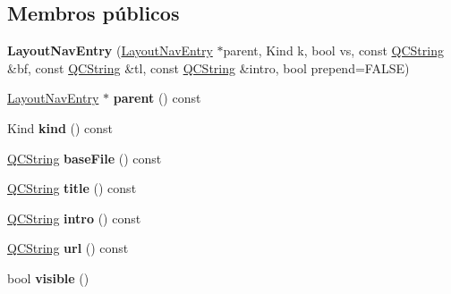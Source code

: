 \subsection*{Membros públicos}
\begin{DoxyCompactItemize}
\item 
\hypertarget{struct_layout_nav_entry_aaf8e4783172c8bc1810d4f166aca1ed6}{{\bfseries Layout\-Nav\-Entry} (\hyperlink{struct_layout_nav_entry}{Layout\-Nav\-Entry} $\ast$parent, Kind k, bool vs, const \hyperlink{class_q_c_string}{Q\-C\-String} \&bf, const \hyperlink{class_q_c_string}{Q\-C\-String} \&tl, const \hyperlink{class_q_c_string}{Q\-C\-String} \&intro, bool prepend=F\-A\-L\-S\-E)}\label{struct_layout_nav_entry_aaf8e4783172c8bc1810d4f166aca1ed6}

\item 
\hypertarget{struct_layout_nav_entry_ae3becba3d5a12aeef0fa8fbe6e29c892}{\hyperlink{struct_layout_nav_entry}{Layout\-Nav\-Entry} $\ast$ {\bfseries parent} () const }\label{struct_layout_nav_entry_ae3becba3d5a12aeef0fa8fbe6e29c892}

\item 
\hypertarget{struct_layout_nav_entry_aa9d037bed9f9a083d0cd01485637d843}{Kind {\bfseries kind} () const }\label{struct_layout_nav_entry_aa9d037bed9f9a083d0cd01485637d843}

\item 
\hypertarget{struct_layout_nav_entry_a1dda37c37ec67d8605b84452767403d9}{\hyperlink{class_q_c_string}{Q\-C\-String} {\bfseries base\-File} () const }\label{struct_layout_nav_entry_a1dda37c37ec67d8605b84452767403d9}

\item 
\hypertarget{struct_layout_nav_entry_adf5241b59706e696c508de8baa4c2f97}{\hyperlink{class_q_c_string}{Q\-C\-String} {\bfseries title} () const }\label{struct_layout_nav_entry_adf5241b59706e696c508de8baa4c2f97}

\item 
\hypertarget{struct_layout_nav_entry_ac90ba2b5b7db86905c2b30192e4c53eb}{\hyperlink{class_q_c_string}{Q\-C\-String} {\bfseries intro} () const }\label{struct_layout_nav_entry_ac90ba2b5b7db86905c2b30192e4c53eb}

\item 
\hypertarget{struct_layout_nav_entry_a33ca03a1959afc82bd99d7c515a9f599}{\hyperlink{class_q_c_string}{Q\-C\-String} {\bfseries url} () const }\label{struct_layout_nav_entry_a33ca03a1959afc82bd99d7c515a9f599}

\item 
\hypertarget{struct_layout_nav_entry_aac61ea8e617a34587fb183c1ee6466ad}{bool {\bfseries visible} ()}\label{struct_layout_nav_entry_aac61ea8e617a34587fb183c1ee6466ad}


\end{DoxyCompactItemize}
